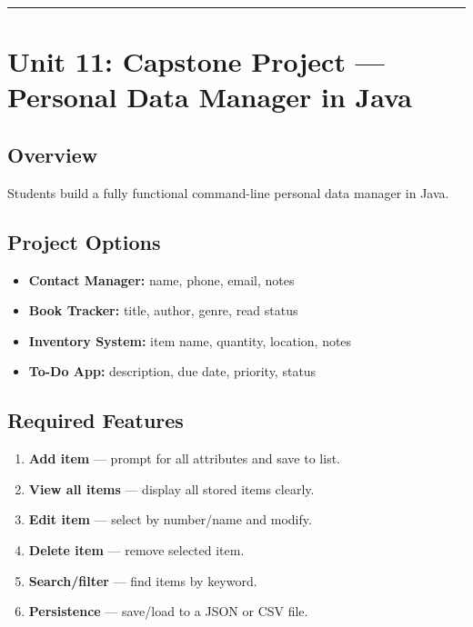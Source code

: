 \documentclass[
  justified,
  openright,
]{tufte-book}
\providecommand{\tightlist}{%
  \setlength{\itemsep}{0pt}\setlength{\parskip}{0pt}}
\begin{document}
\begin{center}\rule{0.5\linewidth}{0.5pt}\end{center}

\section{Unit 11: Capstone Project --- Personal Data Manager in
Java}\label{unit-11-capstone-project-personal-data-manager-in-java}

\subsection{Overview}\label{overview-11}

Students build a fully functional command-line personal data manager in
Java.

\subsection{Project Options}\label{project-options}

\begin{itemize}
\tightlist
\item
  \textbf{Contact Manager:} name, phone, email, notes
\item
  \textbf{Book Tracker:} title, author, genre, read status
\item
  \textbf{Inventory System:} item name, quantity, location, notes
\item
  \textbf{To-Do App:} description, due date, priority, status
\end{itemize}

\subsection{Required Features}\label{required-features}

\begin{enumerate}
\def\labelenumi{\arabic{enumi}.}
\tightlist
\item
  \textbf{Add item} --- prompt for all attributes and save to list.
\item
  \textbf{View all items} --- display all stored items clearly.
\item
  \textbf{Edit item} --- select by number/name and modify.
\item
  \textbf{Delete item} --- remove selected item.
\item
  \textbf{Search/filter} --- find items by keyword.
\item
  \textbf{Persistence} --- save/load to a JSON or CSV file.
\end{enumerate}
\end{document}
